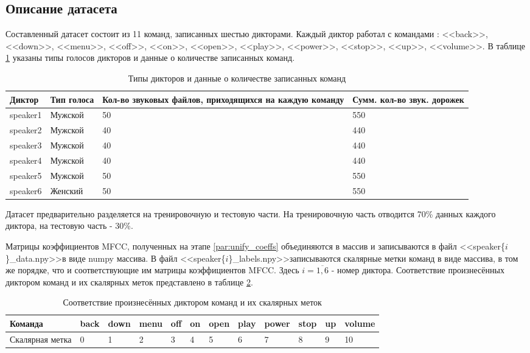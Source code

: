 \subsection{Описание датасета}
Составленный датасет состоит из 11 команд, записанных шестью дикторами. Каждый диктор работал с командами : <<back>>, <<down>>, <<menu>>, <<off>>, <<on>>, <<open>>, <<play>>, <<power>>, <<stop>>, <<up>>, <<volume>>. В таблице \ref{table:dataset} указаны типы голосов дикторов и данные о количестве записанных команд.
\begin{table}[H]
\begin{tabular}[c]{ | p{1.8cm} | p{2.5cm} | p{6cm} | p{4cm} | }
	\hline
	Диктор & Тип голоса & Кол-во звуковых файлов, приходящихся на каждую команду & Сумм. кол-во звук. дорожек  \\ \hline
	speaker1 & Мужской & 50 & 550 \\
	speaker2 & Мужской & 40 & 440 \\
	speaker3 & Мужской & 40 & 440 \\
	speaker4 & Мужской & 40 & 440 \\
	speaker5 & Мужской & 50 & 550 \\
	speaker6 & Женский & 50 & 550 \\ \hline
	
\end{tabular}
\caption{\label{table:dataset}Типы дикторов и данные о количестве записанных команд}
\end{table}

Датасет предварительно разделяется на тренировочную и тестовую части. На тренировочную часть отводится 70\% данных каждого диктора, на тестовую часть - 30\%.

\label{par:saving_preprocessed_data}
Матрицы коэффициентов MFCC, полученных на этапе \ref{par:unify_coeffs} объединяются в массив и записываются в файл <<speaker\{$i$\}\_data.npy>>\footnotemark[\value{footnote}] \space в виде numpy массива. В файл <<speaker\{$i$\}\_labels.npy>>\footnotemark[\value{footnote}] записываются скалярные метки команд в виде массива, в том же порядке, что и соответствующие им матрицы коэффициентов MFCC. Здесь $i=\overline{1,6}$  - номер диктора. Соответствие произнесённых диктором команд и их скалярных меток представлено в таблице \ref{table:commands}.


\begin{table}[H]
	\small
	\begin{tabular}[c]{ | l | l | l | l | l | l | l | l | l | l | l | l |}
		\hline
		Команда	 &  back & down & menu & off & on & open & play & power & stop & up & volume \\ \hline
		Скалярная метка & 0 & 1 & 2 & 3 & 4 & 5 & 6 & 7 & 8 & 9 & 10 \\ \hline
		
	\end{tabular}
	\caption{\label{table:commands}Соответствие произнесённых диктором команд и их скалярных меток}
\end{table}